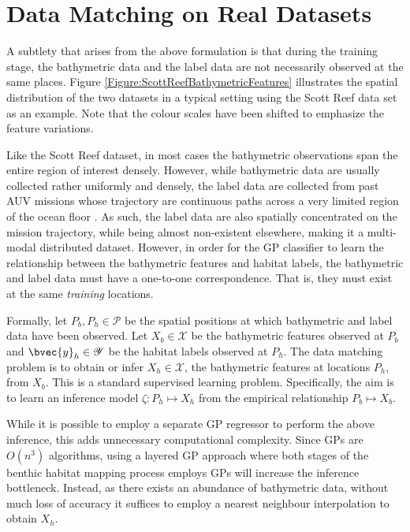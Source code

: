 	\section{Data Matching on Real Datasets}
	\label{Appendix:BathymetricFeatureExtraction:DataMatching}
	
		A subtlety that arises from the above formulation is that during the training stage, the bathymetric data and the label data are not necessarily observed at the same places. Figure \ref{Figure:ScottReefBathymetricFeatures} illustrates the spatial distribution of the two datasets in a typical setting using the Scott Reef data set \citep{IMOS} as an example. Note that the colour scales have been shifted to emphasize the feature variations.
		
		Like the Scott Reef dataset, in most cases the bathymetric observations span the entire region of interest densely. However, while bathymetric data are usually collected rather uniformly and densely, the label data are collected from past AUV missions whose trajectory are continuous paths across a very limited region of the ocean floor \citep{Squidle}. As such, the label data are also spatially concentrated on the mission trajectory, while being almost non-existent elsewhere, making it a multi-modal distributed dataset. However, in order for the GP classifier to learn the relationship between the bathymetric features and habitat labels, the bathymetric and label data must have a one-to-one correspondence. That is, they must exist at the same \textit{training} locations. 
		
		Formally, let $P_{b}, P_{h} \in \mathscr{P}$ be the spatial positions at which bathymetric and label data have been observed. Let $X_{b} \in \mathscr{X}$ be the bathymetric features observed at $P_{b}$ and $\bvec{y}_{h} \in \mathscr{Y}$ be the habitat labels observed at $P_{h}$. The data matching problem is to obtain or infer $X_{h} \in \mathscr{X}$, the bathymetric features at locations $P_{h}$, from $X_{b}$. This is a standard supervised learning problem. Specifically, the aim is to learn an inference model $\zeta: P_{h} \mapsto X_{h}$ from the empirical relationship $P_{b} \mapsto X_{b}$.
		
		While it is possible to employ a separate GP regressor to perform the above inference, this adds unnecessary computational complexity. Since GPs are $O(n^{3})$ algorithms, using a layered GP approach where both stages of the benthic habitat mapping process employs GPs will increase the inference bottleneck. Instead, as there exists an abundance of bathymetric data, without much loss of accuracy it suffices to employ a nearest neighbour interpolation to obtain $X_{h}$. 
			
